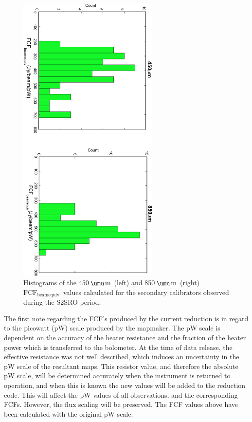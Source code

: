 \documentclass[twoside,11pt]{article}
\newcommand{\micron}{\mbox{\,${\umu}$m}}            %
\renewcommand{\_}{\texttt{\symbol{95}}}
\newcommand{\fcfbe}{$\mathrm{FCF_{beamequiv}}$}
\begin{document}
\begin{figure}
\begin{center}
\includegraphics[width=7cm,angle=90]{sc19_fcf_hist}
\caption{Histograms of the 450\micron\ (left) and 850\micron\ (right)
  \fcfbe\ values calculated for the secondary calibrators observed
  during the S2SRO period.}
\label{fig:fcfs}
\end{center}
\end{figure}

The first note regarding the FCF's produced by the current reduction
is in regard to the picowatt (pW) scale produced by the mapmaker. The
pW scale is dependent on the accuracy of the heater resistance and the
fraction of the heater power which is transferred to the bolometer. At
the time of data release, the effective resistance was not well
described, which induces an uncertainty in the pW scale of the
resultant maps. This resistor value, and therefore the absolute pW
scale, will be determined accurately when the instrument is returned
to operation, and when this is known the new values will be added to
the reduction code. This will affect the pW values of all
observations, and the corresponding FCFs. However, the flux scaling
will be preserved. The FCF values above have been calculated with the
original pW scale.
\end{document}
